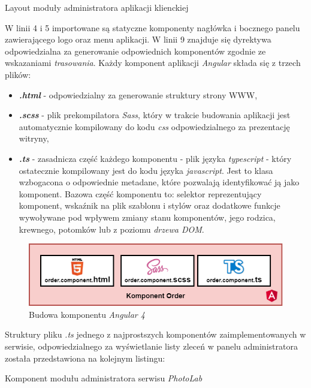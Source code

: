 \begin{listing}[ht]
    \caption{Layout moduły administratora aplikacji klienckiej}
    \label{listing:admin-layout}
\end{listing}

\noindent W linii 4 i 5 importowane są statyczne komponenty nagłówka i bocznego panelu zawierającego logo oraz menu aplikacji. W linii 9 znajduje się dyrektywa odpowiedzialna za generowanie odpowiednich komponentów zgodnie ze wskazaniami \textit{trasowania}. Każdy komponent aplikacji \textit{Angular} składa się z trzech plików:
\begin{itemize}
    \item \textbf{\textit{.html}} - odpowiedzialny za generowanie struktury strony WWW,
    \item \textbf{\textit{.scss}} - plik prekompilatora \textit{Sass}, który w trakcie budowania aplikacji jest automatycznie kompilowany do kodu \textit{css} odpowiedzialnego za prezentację witryny,
    \item \textbf{\textit{.ts}} - zasadnicza część każdego komponentu - plik języka \textit{typescript} - który ostatecznie kompilowany jest do kodu języka \textit{javascript}. Jest to klasa wzbogacona o odpowiednie metadane, które pozwalają identyfikować ją jako komponent. Bazowa część komponentu to: selektor reprezentujący komponent, wskaźnik na plik szablonu i stylów oraz dodatkowe funkcje wywoływane pod wpływem zmiany stanu komponentów, jego rodzica, krewnego, potomków lub z poziomu \textit{drzewa DOM}.
\end{itemize}

\begin{figure}[ht]
	\centering
	\includegraphics[width=0.75\linewidth]{graphics/chapter-4/order-component.png}
	\caption{Budowa komponentu \textit{Angular 4}}
	\label{fig:order-component}
\end{figure}
\noindent Struktury pliku \textit{.ts} jednego z najprostszych komponentów zaimplementowanych w serwisie, odpowiedzialnego za wyświetlanie listy zleceń w panelu administratora została przedstawiona na kolejnym listingu:
\newpage

\begin{listing}[ht]
    \caption{Komponent modułu administratora serwisu \textit{PhotoLab}}
    \label{listing:component-client}
\end{listing}

